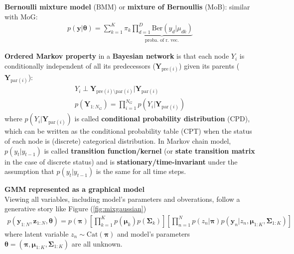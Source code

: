 \textbf{Bernoulli mixture model} (BMM) or \textbf{mixture of Bernoullis} (MoB):
similar with MoG:
\begin{gather}
    p(\bm{y}|\bm{\theta})=\sum_{k=1}^K{\pi_k\underbrace{\prod_{d=1}^D\mathrm{Ber}(y_d|\mu_{dk})}_{\text{proba. of r. vec.}}}
\end{gather}

\textbf{Ordered Markov property} in a \textbf{Bayesian network} is that 
each node $Y_i$ is conditionally independent of all its predecessors ($\bm{Y}_{\text{pre}(i)}$) given its parents ($\bm{Y}_{\text{par}(i)}$):
\begin{gather}
    Y_i\perp\bm{Y}_{\text{pre}(i)\setminus\text{par}(i)}|\bm{Y}_{\text{par}(i)}\\
    p(\bm{Y}_{1:N_G})=\prod_{i=1}^{N_G}p\left(Y_i|\bm{Y}_{\text{par}(i)}\right)
\end{gather}
where $p\left(Y_i|\bm{Y}_{\text{par}(i)}\right)$ is called \textbf{conditional probability distribution} (CPD), 
which can be written as the conditional probability table (CPT) 
when the status of each node is (discrete) categorical distribution.
In Markov chain model, 
$p(y_t|y_{t-1})$ is called \textbf{transition function/kernel} (or \textbf{state transition matrix} in the case of discrete status) and is \textbf{stationary/time-invariant} under the assumption that $p(y_t|y_{t-1})$ is the same for all time steps.




\begin{example}
    \textbf{GMM represented as a graphical model}\\
    Viewing all variables, including model's parameters and obverations, 
    follow a generative story like Figure (\ref{fig:mixgaussian})
    {\small\begin{gather}
        p(\bm{y}_{1:N},\bm{z}_{1:N},\bm{\theta})
        = p(\bm{\pi})
        \left[ \prod_{k=1}^K p(\bm{\mu}_k)p(\bm{\Sigma}_k) \right]
        \left[ \prod_{n=1}^N p(z_n|\bm{\pi})p(\bm{y}_n|z_n,\bm{\mu}_{1:K},\bm{\Sigma}_{1:K}) \right]
    \end{gather}}
    where latent variable $z_n\sim\text{Cat}(\bm{\pi})$ and model's parameters
    $\bm{\theta}=(\bm{\pi},\bm{\mu}_{1:K},\bm{\Sigma}_{1:K})$ are all unknown.
\end{example}


